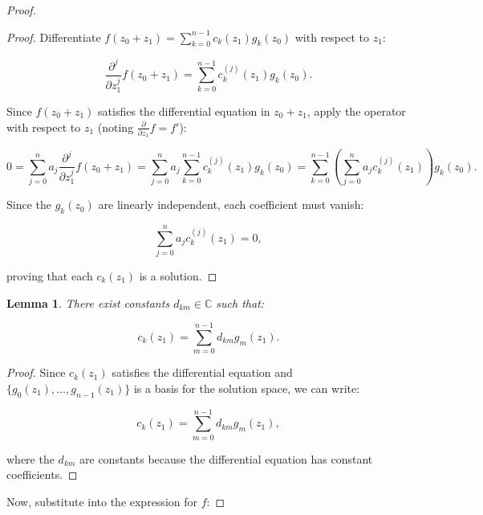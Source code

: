 \documentclass{article}
\newtheorem{lemma}[theorem]{Lemma}
\begin{document}
\begin{proof}
		\begin{proof}
			Differentiate \(f(z_0 + z_1) = \sum_{k=0}^{n-1} c_k(z_1) g_k(z_0)\) with respect to \(z_1\):
			
			\begin{equation}
				\frac{\partial^j}{\partial z_1^j} f(z_0 + z_1) = \sum_{k=0}^{n-1} c_k^{(j)}(z_1) g_k(z_0).
			\end{equation}
			
			Since \(f(z_0 + z_1)\) satisfies the differential equation in \(z_0 + z_1\), apply the operator with respect to \(z_1\) (noting \(\frac{\partial}{\partial z_1} f = f'\)):
			
			\begin{equation}
				0 = \sum_{j=0}^n a_j \frac{\partial^j}{\partial z_1^j} f(z_0 + z_1) = \sum_{j=0}^n a_j \sum_{k=0}^{n-1} c_k^{(j)}(z_1) g_k(z_0) = \sum_{k=0}^{n-1} \left( \sum_{j=0}^n a_j c_k^{(j)}(z_1) \right) g_k(z_0).
			\end{equation}
			
			Since the \(g_k(z_0)\) are linearly independent, each coefficient must vanish:
			
			\begin{equation}
				\sum_{j=0}^n a_j c_k^{(j)}(z_1) = 0,
			\end{equation}
			
			proving that each \(c_k(z_1)\) is a solution.
		\end{proof}
		
		\begin{lemma}
			There exist constants \(d_{km} \in \mathbb{C}\) such that:
			
			\begin{equation}
				c_k(z_1) = \sum_{m=0}^{n-1} d_{km} g_m(z_1).
			\end{equation}
		\end{lemma}
		
		\begin{proof}
			Since \(c_k(z_1)\) satisfies the differential equation and \(\{g_0(z_1), \ldots, g_{n-1}(z_1)\}\) is a basis for the solution space, we can write:
			
			\begin{equation}
				c_k(z_1) = \sum_{m=0}^{n-1} d_{km} g_m(z_1),
			\end{equation}
			
			where the \(d_{km}\) are constants because the differential equation has constant coefficients.
		\end{proof}
		
		Now, substitute into the expression for \(f\):
		

\end{proof}
\end{document}
